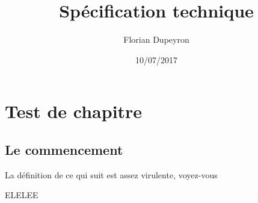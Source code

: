 \documentclass[]{mst-poly}
\title{Spécification technique}
\author{Florian Dupeyron}
\date{10/07/2017}
\begin{document}
	\chapter{ Test de chapitre }
	\section{Le commencement}
    \begin{defn}
        La définition de ce qui suit est assez virulente, voyez-vous
    \end{defn}
    ELELEE
\end{document}
